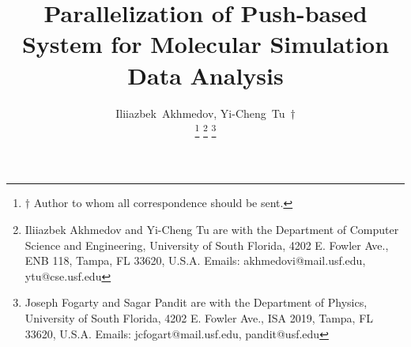 \documentclass[10pt,journal,final,letterpaper,twocolumn]{IEEEtran}
\begin{document}
\title{Parallelization of Push-based System for Molecular Simulation Data Analysis}


\author{Iliiazbek~Akhmedov, Yi-Cheng~Tu~$\dagger$%

\thanks{$\dagger$ Author to whom all correspondence should be sent.}
\thanks{Iliiazbek Akhmedov and Yi-Cheng Tu are with the Department of Computer Science and Engineering, University of South Florida, 4202 E. Fowler Ave., ENB 118, Tampa, FL 33620, U.S.A. Emails:
akhmedovi@mail.usf.edu, ytu@cse.usf.edu}
\thanks{Joseph Fogarty and Sagar Pandit are with the Department of Physics,
University of South Florida, 4202 E. Fowler Ave., ISA 2019, Tampa,
FL 33620, U.S.A. Emails: jcfogart@mail.usf.edu, pandit@usf.edu} }



\maketitle
\end{document}

